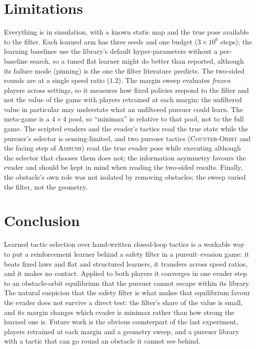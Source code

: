 \documentclass[conference]{IEEEtran}
\newcommand{\pol}[1]{\textsc{#1}}
\begin{document}
\section{Limitations}
\label{sec:limits}
Everything is in simulation, with a known static map and the true pose available to the filter. Each learned arm has three seeds and one budget ($3\times10^{6}$ steps); the learning baselines use the library's default hyper-parameters without a per-baseline search, so a tuned flat learner might do better than reported, although its failure mode (pinning) is the one the filter literature predicts. The two-sided rounds are at a single speed ratio ($1.2$). The margin sweep evaluates \emph{frozen} players across settings, so it measures how fixed policies respond to the filter and not the value of the game with players retrained at each margin; the unfiltered value in particular may understate what an unfiltered pursuer could learn. The meta-game is a $4\times4$ pool, so ``minimax'' is relative to that pool, not to the full game. The scripted evaders and the evader's tactics read the true state while the pursuer's selector is sensing-limited, and two pursuer tactics (\pol{Counter-Orbit} and the facing step of \pol{Ambush}) read the true evader pose while executing although the selector that chooses them does not; the information asymmetry favours the evader and should be kept in mind when reading the two-sided results. Finally, the obstacle's own role was not isolated by removing obstacles; the sweep varied the filter, not the geometry.

\section{Conclusion}
Learned tactic selection over hand-written closed-loop tactics is a workable way to put a reinforcement learner behind a safety filter in a pursuit--evasion game: it beats fixed laws and flat and structured learners, it transfers across speed ratios, and it makes no contact. Applied to both players it converges in one evader step to an obstacle-orbit equilibrium that the pursuer cannot escape within its library. The natural suspicion that the safety filter is what makes that equilibrium favour the evader does not survive a direct test: the filter's share of the value is small, and its margin changes which evader is minimax rather than how strong the learned one is. Future work is the obvious counterpart of the last experiment, players retrained at each margin and a geometry sweep, and a pursuer library with a tactic that can go round an obstacle it cannot see behind.
\end{document}
